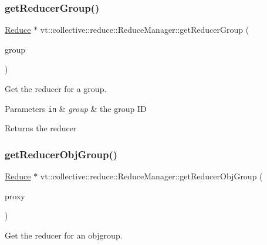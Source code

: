 \subsubsection{\texorpdfstring{get\+Reducer\+Group()}{getReducerGroup()}}
{\footnotesize\ttfamily \hyperlink{structvt_1_1collective_1_1reduce_1_1_reduce}{Reduce} $\ast$ vt\+::collective\+::reduce\+::\+Reduce\+Manager\+::get\+Reducer\+Group (\begin{DoxyParamCaption}\item[{\hyperlink{namespacevt_a27b5e4411c9b6140c49100e050e2f743}{Group\+Type} const \&}]{group }\end{DoxyParamCaption})}



Get the reducer for a group. 


\begin{DoxyParams}[1]{Parameters}
\mbox{\tt in}  & {\em group} & the group ID\\
\hline
\end{DoxyParams}
\begin{DoxyReturn}{Returns}
the reducer 
\end{DoxyReturn}
\mbox{\label{structvt_1_1collective_1_1reduce_1_1_reduce_manager_a712bf763fda2a663e87edc524f99839f}} 
\subsubsection{\texorpdfstring{get\+Reducer\+Obj\+Group()}{getReducerObjGroup()}}
{\footnotesize\ttfamily \hyperlink{structvt_1_1collective_1_1reduce_1_1_reduce}{Reduce} $\ast$ vt\+::collective\+::reduce\+::\+Reduce\+Manager\+::get\+Reducer\+Obj\+Group (\begin{DoxyParamCaption}\item[{\hyperlink{namespacevt_ad7cae989df485fccca57f0792a880a8e}{Obj\+Group\+Proxy\+Type} const \&}]{proxy }\end{DoxyParamCaption})}



Get the reducer for an objgroup. 


